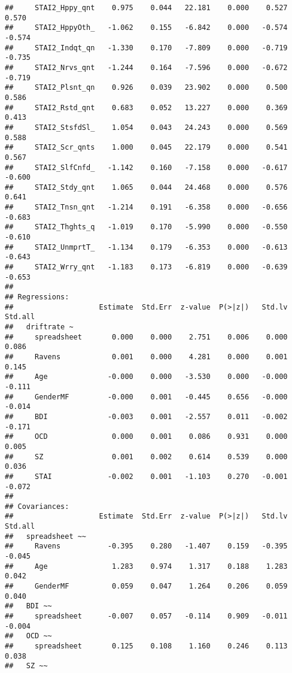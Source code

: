 \documentclass[]{article}
\begin{document}
\begin{verbatim}
##     STAI2_Hppy_qnt    0.975    0.044   22.181    0.000    0.527    0.570
##     STAI2_HppyOth_   -1.062    0.155   -6.842    0.000   -0.574   -0.574
##     STAI2_Indqt_qn   -1.330    0.170   -7.809    0.000   -0.719   -0.735
##     STAI2_Nrvs_qnt   -1.244    0.164   -7.596    0.000   -0.672   -0.719
##     STAI2_Plsnt_qn    0.926    0.039   23.902    0.000    0.500    0.586
##     STAI2_Rstd_qnt    0.683    0.052   13.227    0.000    0.369    0.413
##     STAI2_StsfdSl_    1.054    0.043   24.243    0.000    0.569    0.588
##     STAI2_Scr_qnts    1.000    0.045   22.179    0.000    0.541    0.567
##     STAI2_SlfCnfd_   -1.142    0.160   -7.158    0.000   -0.617   -0.600
##     STAI2_Stdy_qnt    1.065    0.044   24.468    0.000    0.576    0.641
##     STAI2_Tnsn_qnt   -1.214    0.191   -6.358    0.000   -0.656   -0.683
##     STAI2_Thghts_q   -1.019    0.170   -5.990    0.000   -0.550   -0.610
##     STAI2_UnmprtT_   -1.134    0.179   -6.353    0.000   -0.613   -0.643
##     STAI2_Wrry_qnt   -1.183    0.173   -6.819    0.000   -0.639   -0.653
## 
## Regressions:
##                    Estimate  Std.Err  z-value  P(>|z|)   Std.lv  Std.all
##   driftrate ~                                                           
##     spreadsheet       0.000    0.000    2.751    0.006    0.000    0.086
##     Ravens            0.001    0.000    4.281    0.000    0.001    0.145
##     Age              -0.000    0.000   -3.530    0.000   -0.000   -0.111
##     GenderMF         -0.000    0.001   -0.445    0.656   -0.000   -0.014
##     BDI              -0.003    0.001   -2.557    0.011   -0.002   -0.171
##     OCD               0.000    0.001    0.086    0.931    0.000    0.005
##     SZ                0.001    0.002    0.614    0.539    0.000    0.036
##     STAI             -0.002    0.001   -1.103    0.270   -0.001   -0.072
## 
## Covariances:
##                    Estimate  Std.Err  z-value  P(>|z|)   Std.lv  Std.all
##   spreadsheet ~~                                                        
##     Ravens           -0.395    0.280   -1.407    0.159   -0.395   -0.045
##     Age               1.283    0.974    1.317    0.188    1.283    0.042
##     GenderMF          0.059    0.047    1.264    0.206    0.059    0.040
##   BDI ~~                                                                
##     spreadsheet      -0.007    0.057   -0.114    0.909   -0.011   -0.004
##   OCD ~~                                                                
##     spreadsheet       0.125    0.108    1.160    0.246    0.113    0.038
##   SZ ~~                                                                 

\end{verbatim}
\end{document}
